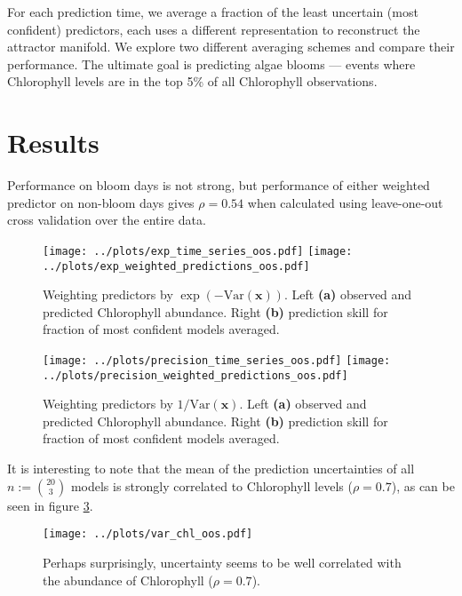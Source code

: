 \documentclass[fleqn,10pt]{wlscirep}
\newcommand{\un}{\text{Var}}
\newcommand{\x}{\mathbf{x}}
\begin{document}
For each prediction time, we average a fraction of the least uncertain
(most confident) predictors, each uses a different representation to
reconstruct the attractor manifold. We explore two different averaging
schemes and compare their performance. The ultimate goal is predicting
algae blooms --- events where Chlorophyll levels are in the top 5\% of
all Chlorophyll observations.

\section{Results}\label{section:results}
Performance on bloom days is not strong, but performance of either
weighted predictor on non-bloom days gives $\rho = 0.54$ when
calculated using leave-one-out cross validation over the entire data.

\begin{figure}
  \centering
  \texttt{[image: ../plots/exp\_time\_series\_oos.pdf]}
  \texttt{[image: ../plots/exp\_weighted\_predictions\_oos.pdf]}
  \caption{Weighting predictors by $\exp \left ( -\un (\x) \right
    )$. Left \textbf{(a)} observed and predicted Chlorophyll
    abundance. Right \textbf{(b)} prediction skill for fraction of most
    confident models averaged.}
  \label{fig:exp}
\end{figure}

\begin{figure}
\centering
  \texttt{[image: ../plots/precision\_time\_series\_oos.pdf]}
  \texttt{[image: ../plots/precision\_weighted\_predictions\_oos.pdf]}
  \caption{Weighting predictors by $1 \big / \un (\x)$. Left
    \textbf{(a)} observed and predicted Chlorophyll abundance. Right
    \textbf{(b)} prediction skill for fraction of most confident models
    averaged.}
  \label{fig:prec}
\end{figure}

It is interesting to note that the mean of the prediction uncertainties of
all $n:=\binom{20}{3}$ models is strongly correlated to Chlorophyll
levels ($\rho = 0.7$), as can be seen in figure \ref{fig:var chl}.

\begin{figure}[ht]
\centering
\texttt{[image: ../plots/var\_chl\_oos.pdf]}
\caption{Perhaps surprisingly, uncertainty seems to be well correlated
  with the abundance of Chlorophyll ($\rho = 0.7$).}
\label{fig:var chl}
\end{figure}
\end{document}
